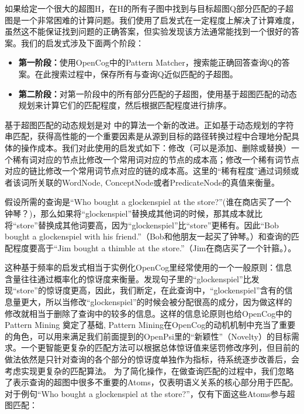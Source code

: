 如果给定一个很大的超图H，在H的所有子图中找到与目标超图Q部分匹配的子超图是一个非常困难的计算问题。我们使用了启发式在一定程度上解决了计算难度，虽然这不能保证找到问题的正确答案，但实验发现该方法通常能找到一个很好的答案。我们的启发式涉及下面两个阶段：

\begin{itemize}
\item {\bf 第一阶段：}使用OpenCog中的Pattern Matcher，搜索能正确回答查询Q的答案。在此搜索过程中，保存所有与查询Q近似匹配的子超图。
\item {\bf 第二阶段：}对第一阶段中的所有部分匹配的子超图，使用基于超图匹配的动态规划来计算它们的匹配程度，然后根据匹配程度进行排序。
\end{itemize}
基于超图匹配的动态规划是对 \cite{Zass2008}中的算法一个新的改进。正如基于动态规划的字符串匹配，获得高性能的一个重要因素是从源到目标的路径转换过程中合理地分配具体的操作成本。我们对此使用的启发式如下：修改（可以是添加、删除或替换）一个稀有词对应的节点比修改一个常用词对应的节点的成本高；修改一个稀有词节点对应的链比修改一个常用词节点对应的链的成本高。这里的“稀有程度”通过词频或者该词所关联的WordNode, ConceptNode或者PredicateNode的真值来衡量。

假设所需的查询是“Who bought a glockenspiel at the store?”(谁在商店买了一个钟琴？)，那么如果将“glockenspiel”替换成其他词的时候，那其成本就比将“store”替换成其他词要高，因为“glockenspiel”比“store”更稀有。因此“Bob bought a glockenspiel with his friend.”（Bob和他朋友一起买了钟琴。）和查询的匹配程度要高于“Jim bought a thimble at the store.”（Jim在商店买了一个针箍。）。

这种基于频率的启发式相当于实例化OpenCog里经常使用的一个一般原则：信息含量往往通过概率化的惊讶度来衡量。发现句子里的“glockenspiel”比发现“store”的惊讶度更高，因此，我们断定，在此查询中，“glockenspiel”含有的信息量更大，所以当修改“glockenspiel”的时候会被分配很高的成分，因为做这样的修改就相当于删除了查询中的较多的信息。这样的信息论原则也给OpenCog中的Pattern Mining\cite{ONeill2012} 奠定了基础, Pattern Mining在OpenCog的动机机制中充当了重要的角色，可以用来满足我们前面提到的OpenPsi里的“新颖性”（Novelty）的目标需求。一个更智能更复杂的匹配方法可以根据总体惊讶值来惩罚修改序列，但目前的做法依然是只针对查询的各个部分的惊讶度单独作为指标，待系统逐步改善后，会考虑实现更复杂的匹配算法。
为了简化操作，在做查询匹配的过程中，我们忽略了表示查询的超图中很多不重要的Atoms，仅表明语义关系的核心部分用于匹配。对于例句“Who bought a glockenspiel at the store?”，仅有下面这些Atoms参与超图匹配：

